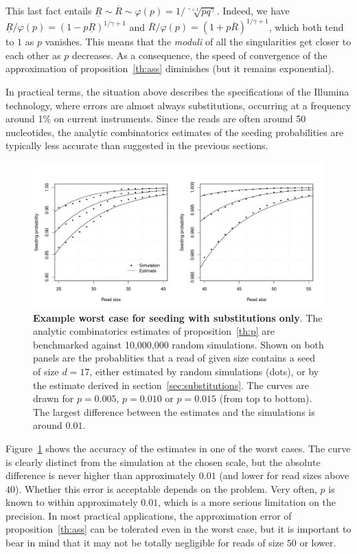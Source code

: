 \documentclass{article}
\begin{document}
This last fact entails $\underline{R} \sim \overline{R} \sim \varphi(p) =
1/ \sqrt[\gamma+1]{pq^\gamma}$. Indeed, we have $\underline{R}/\varphi(p)
= (1-p\underline{R})^{1/\gamma+1}$ and $\overline{R}/\varphi(p) =
(1+p\overline{R})^{1/\gamma+1}$, which both tend to $1$ as $p$ vanishes.
This means that the \textit{moduli} of all the singularities get closer to
each other as $p$ decreases. As a consequence, the speed of convergence of
the approximation of proposition~\ref{th:ass} diminishes (but it remains
exponential).

In practical terms, the situation above describes the specifications of
the Illumina technology, where errors are almost always substitutions,
occurring at a frequency around 1\% on current instruments. Since the
reads are often around 50 nucleotides, the analytic combinatorics
estimates of the seeding probabilities are typically less accurate than
suggested in the previous sections.


\begin{figure}[h]
\centering
\includegraphics[scale=0.445]{simulp_short.pdf}
\caption{\textbf{Example worst case for seeding with substitutions only}.
The analytic combinatorics estimates of proposition~\ref{th:p} are
benchmarked against 10,000,000 random simulations. Shown on both panels
are the probablities that a read of given size contains a seed of size
$d=17$, either estimated by random simulations (dots), or by the estimate
derived in section~\ref{sec:substitutions}. The curves are drawn for
$p=0.005$, $p=0.010$ or $p=0.015$ (from top to bottom). The largest
difference between the estimates and the simulations is around $0.01$.}
\label{fig:illumina}
\end{figure}

Figure~\ref{fig:illumina} shows the accuracy of the estimates in one of
the worst cases. The curve is clearly distinct from the simulation at the
chosen scale, but the absolute difference is never higher than
approximately $0.01$ (and lower for read sizes above $40$). Whether this
error is acceptable depends on the problem. Very often, $p$ is known to
within approximately $0.01$, which is a more serious limitation on the
precision. In most practical applications, the approximation error of
proposition~\ref{th:ass} can be tolerated even in the worst case, but it
is important to bear in mind that it may not be totally negligible for
reads of size $50$ or lower.
\end{document}
